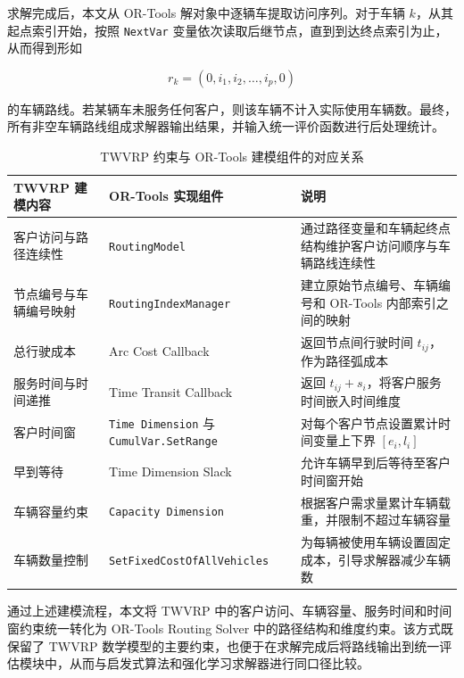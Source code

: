 \documentclass[12pt,a4paper,UTF8]{article}
\begin{document}
求解完成后，本文从 OR-Tools 解对象中逐辆车提取访问序列。对于车辆 $k$，从其起点索引开始，按照 \texttt{NextVar} 变量依次读取后继节点，直到到达终点索引为止，从而得到形如

\[
    r_k=(0,i_1,i_2,\dots,i_p,0)
\]

的车辆路线。若某辆车未服务任何客户，则该车辆不计入实际使用车辆数。最终，所有非空车辆路线组成求解器输出结果，并输入统一评价函数进行后处理统计。

\begin{table}[!htbp]
    \centering
    \caption{TWVRP 约束与 OR-Tools 建模组件的对应关系}
    \label{tab:ortools_model_mapping}
    \small
    \begin{tabularx}{\textwidth}{p{3.8cm} p{4.2cm} X}
        \toprule
        TWVRP 建模内容 & OR-Tools 实现组件 & 说明 \\
        \midrule
        客户访问与路径连续性 &
        \texttt{RoutingModel} &
        通过路径变量和车辆起终点结构维护客户访问顺序与车辆路线连续性 \\
        \midrule
        节点编号与车辆编号映射 &
        \texttt{RoutingIndexManager} &
        建立原始节点编号、车辆编号和 OR-Tools 内部索引之间的映射 \\
        \midrule
        总行驶成本 &
        Arc Cost Callback &
        返回节点间行驶时间 $t_{ij}$，作为路径弧成本 \\
        \midrule
        服务时间与时间递推 &
        Time Transit Callback &
        返回 $t_{ij}+s_i$，将客户服务时间嵌入时间维度 \\
        \midrule
        客户时间窗 &
        \texttt{Time Dimension} 与 \texttt{CumulVar.SetRange} &
        对每个客户节点设置累计时间变量上下界 $[e_i,l_i]$ \\
        \midrule
        早到等待 &
        Time Dimension Slack &
        允许车辆早到后等待至客户时间窗开始 \\
        \midrule
        车辆容量约束 &
        \texttt{Capacity Dimension} &
        根据客户需求量累计车辆载重，并限制不超过车辆容量 \\
        \midrule
        车辆数量控制 &
        \texttt{SetFixedCostOfAllVehicles} &
        为每辆被使用车辆设置固定成本，引导求解器减少车辆数 \\
        \bottomrule
    \end{tabularx}
\end{table}

通过上述建模流程，本文将 TWVRP 中的客户访问、车辆容量、服务时间和时间窗约束统一转化为 OR-Tools Routing Solver 中的路径结构和维度约束。该方式既保留了 TWVRP 数学模型的主要约束，也便于在求解完成后将路线输出到统一评估模块中，从而与启发式算法和强化学习求解器进行同口径比较。
\end{document}
